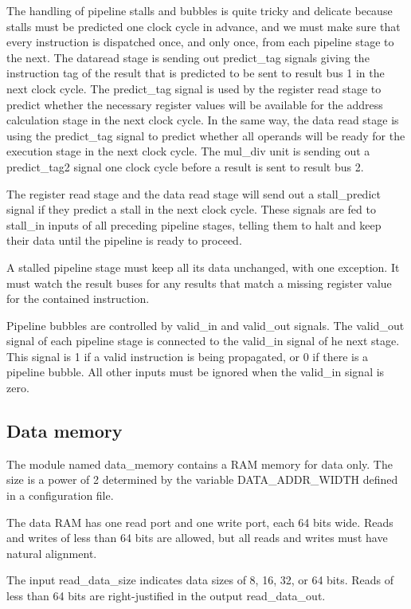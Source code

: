 \documentclass[11pt,a4paper,oneside,openright]{report}
\newcommand{\vv}{ \vspace{2mm} }   %
\begin{document}
The handling of pipeline stalls and bubbles is quite tricky and delicate because stalls must be predicted one clock cycle in advance, and we must make sure that every instruction is dispatched once, and only once, from each pipeline stage to the next. The dataread stage is sending out predict\_tag signals giving the instruction tag of the result that is predicted to be sent to result bus 1 in the next clock cycle. The predict\_tag signal is used by the register read stage to predict whether the necessary register values will be available for the address calculation stage in the next clock cycle. In the same way, the data read stage is using the predict\_tag signal to predict whether all operands will be ready for the execution stage in the next clock cycle. The mul\_div unit is sending out a predict\_tag2 signal one clock cycle before a result is sent to result bus 2.
\vv

The register read stage and the data read stage will send out a stall\_predict signal if they predict a stall in the next clock cycle. These signals are fed to stall\_in inputs of all preceding pipeline stages, telling them to halt and keep their data until the pipeline is ready to proceed.
\vv

A stalled pipeline stage must keep all its data unchanged, with one exception. It must watch the result buses for any results that match a missing register value for the contained instruction. 
\vv

Pipeline bubbles are controlled by valid\_in and valid\_out signals. The valid\_out signal of each pipeline stage is connected to the valid\_in signal of he next stage. This signal is 1 if a valid instruction is being propagated, or 0 if there is a pipeline bubble. All other inputs must be ignored when the valid\_in signal is zero.
\vv


\subsection{Data memory}
The module named data\_memory contains a RAM memory for data only. The size is a power of 2 determined by the variable DATA\_ADDR\_WIDTH defined in a configuration file.
\vv

The data RAM has one read port and one write port, each 64 bits wide. Reads and writes of less than 64 bits are allowed, but all reads and writes must have natural alignment.
\vv

The input read\_data\_size indicates data sizes of 8, 16, 32, or 64 bits. Reads of less than 64 bits are right-justified in the output read\_data\_out.
\vv
\end{document}
